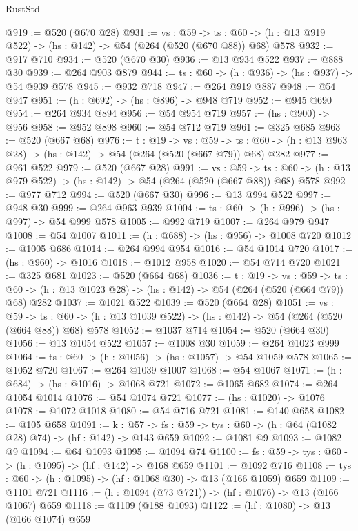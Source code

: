 \begin{lexlean}{RustStd}
\begin{coremodule}
@919 := @520 (@670 @28)
@931 := {vs : @59} ->
  {ts : @60} -> (h : @13 @919 @522) -> (hs : @142) -> @54 (@264 (@520 (@670 @88)) @68) @578
@932 := @917 @710
@934 := @520 (@670 @30)
@936 := @13 @934 @522
@937 := @888 @30
@939 := @264 @903 @879
@944 := {ts : @60} -> (h : @936) -> (hs : @937) -> @54 @939 @578
@945 := @932 @718
@947 := @264 @919 @887
@948 := @54 @947
@951 := (h : @692) -> (hs : @896) -> @948 @719
@952 := @945 @690
@954 := @264 @934 @894
@956 := @54 @954 @719
@957 := (hs : @900) -> @956
@958 := @952 @898
@960 := @54 @712 @719
@961 := @325 @685
@963 := @520 (@667 @68)
@976 := {t : @19} ->
  {vs : @59} ->
  {ts : @60} -> (h : @13 @963 @28) -> (hs : @142) -> @54 (@264 (@520 (@667 @79)) @68) @282
@977 := @961 @522
@979 := @520 (@667 @28)
@991 := {vs : @59} ->
  {ts : @60} -> (h : @13 @979 @522) -> (hs : @142) -> @54 (@264 (@520 (@667 @88)) @68) @578
@992 := @977 @712
@994 := @520 (@667 @30)
@996 := @13 @994 @522
@997 := @948 @30
@999 := @264 @963 @939
@1004 := {ts : @60} -> (h : @996) -> (hs : @997) -> @54 @999 @578
@1005 := @992 @719
@1007 := @264 @979 @947
@1008 := @54 @1007
@1011 := (h : @688) -> (hs : @956) -> @1008 @720
@1012 := @1005 @686
@1014 := @264 @994 @954
@1016 := @54 @1014 @720
@1017 := (hs : @960) -> @1016
@1018 := @1012 @958
@1020 := @54 @714 @720
@1021 := @325 @681
@1023 := @520 (@664 @68)
@1036 := {t : @19} ->
  {vs : @59} ->
  {ts : @60} -> (h : @13 @1023 @28) -> (hs : @142) -> @54 (@264 (@520 (@664 @79)) @68) @282
@1037 := @1021 @522
@1039 := @520 (@664 @28)
@1051 := {vs : @59} ->
  {ts : @60} -> (h : @13 @1039 @522) -> (hs : @142) -> @54 (@264 (@520 (@664 @88)) @68) @578
@1052 := @1037 @714
@1054 := @520 (@664 @30)
@1056 := @13 @1054 @522
@1057 := @1008 @30
@1059 := @264 @1023 @999
@1064 := {ts : @60} -> (h : @1056) -> (hs : @1057) -> @54 @1059 @578
@1065 := @1052 @720
@1067 := @264 @1039 @1007
@1068 := @54 @1067
@1071 := (h : @684) -> (hs : @1016) -> @1068 @721
@1072 := @1065 @682
@1074 := @264 @1054 @1014
@1076 := @54 @1074 @721
@1077 := (hs : @1020) -> @1076
@1078 := @1072 @1018
@1080 := @54 @716 @721
@1081 := @140 @658
@1082 := @105 @658
@1091 := {k : @57} ->
  {fs : @59} -> {tys : @60} -> (h : @64 (@1082 @28) @74) -> (hf : @142) -> @143 @659
@1092 := @1081 @9
@1093 := @1082 @9
@1094 := @64 @1093
@1095 := @1094 @74
@1100 := {fs : @59} -> {tys : @60} -> (h : @1095) -> (hf : @142) -> @168 @659
@1101 := @1092 @716
@1108 := {tys : @60} -> (h : @1095) -> (hf : @1068 @30) -> @13 (@166 @1059) @659
@1109 := @1101 @721
@1116 := (h : @1094 (@73 @721)) -> (hf : @1076) -> @13 (@166 @1067) @659
@1118 := @1109 (@188 @1093)
@1122 := (hf : @1080) -> @13 (@166 @1074) @659

\end{coremodule}
\end{lexlean}
